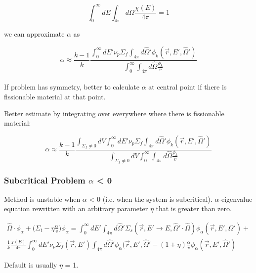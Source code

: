 \documentclass{article}
\begin{document}
\begin{equation*}
\int_{0}^{\infty} dE \int_{4\pi} d\Omega \frac{\chi(E)}{4\pi} = 1
\end{equation*}

we can approximate $\alpha$ as 

\begin{equation*}
\alpha \approx \frac{k-1}{k} \frac{\int_{0}^{\infty} dE' \nu_p \Sigma_f \int_{4\pi} d\hat{\Omega}' \phi_{k}(\vec{r},E',\hat{\Omega}')}{\int_{0}^{\infty}\int_{4\pi} d\hat{\Omega}\frac{\phi_k}{v}}
\end{equation*}
\\
If problem has symmetry, better to calculate $\alpha$ at central point if there is fissionable material at that point.

Better estimate by integrating over everywhere where there is fissionable material:

\begin{equation*}
\alpha \approx \frac{k-1}{k} \frac{\int_{\Sigma_f \neq 0} dV \int_{0}^{\infty} dE' \nu_p \Sigma_f \int_{4\pi} d\hat{\Omega}' \phi_{k}(\vec{r},E',\hat{\Omega}')}{\int_{\Sigma_f \neq 0} dV \int_{0}^{\infty}\int_{4\pi} d\hat{\Omega}\frac{\phi_k}{v}}
\end{equation*}

\subsubsection*{Subcritical Problem $\alpha$ < 0}

Method is unstable when $\alpha$ < 0 (i.e. when the system is subcritical). $\alpha$-eigenvalue equation rewritten with an arbitrary parameter $\eta$ that is greater than zero.

\begin{equation*}
\begin{split}
\hat{\Omega} \cdot \phi_{\alpha} + \bigg ( \Sigma_t - \eta \frac{\alpha}{v} \bigg ) \phi_{\alpha} = \int_{0}^{\infty} dE' \int_{4\pi} d\hat{\Omega}' \Sigma_{s}(\vec{r},E'\rightarrow E, \hat{\Omega}' \cdot \hat{\Omega})\phi_{\alpha}(\vec{r},E',\hat{\Omega}') + \\ \frac{1}{k}\frac{\chi(E)}{4\pi} \int_{0}^{\infty} dE' \nu_{p} \Sigma_{f}(\vec{r},E') \int_{4\pi} d\hat{\Omega}'\phi_{\alpha}(\vec{r},E',\hat{\Omega}' - (1+\eta)\frac{\alpha}{v}\phi_{\alpha}(\vec{r},E',\hat{\Omega}')
\end{split}
\end{equation*}

Default is usually $\eta$ = 1.
\end{document}
